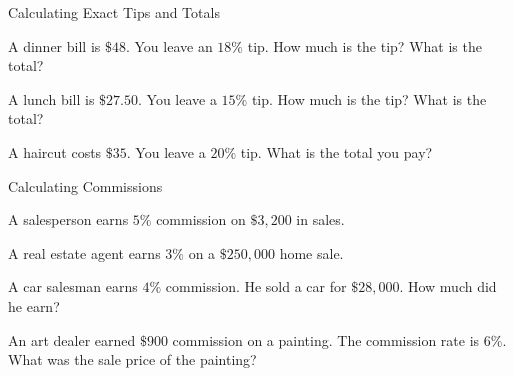 \begin{practiceBox}{Calculating Exact Tips and Totals}


\prob A dinner bill is $\$48$. You leave an $18\%$ tip. How much is the tip? What is the total?
\answerBlank[3cm]

\prob A lunch bill is $\$27.50$. You leave a $15\%$ tip. How much is the tip? What is the total?
\answerBlank[3cm]

\prob A haircut costs $\$35$. You leave a $20\%$ tip. What is the total you pay?
\answerBlank[3cm]

\end{practiceBox}

\begin{practiceBox}[funTeal]{Calculating Commissions}


\prob A salesperson earns $5\%$ commission on $\$3{,}200$ in sales. \answerBlank[3cm]

\prob A real estate agent earns $3\%$ on a $\$250{,}000$ home sale. \answerBlank[3cm]

\prob A car salesman earns $4\%$ commission. He sold a car for $\$28{,}000$. How much did he earn? \answerBlank[3cm]

\prob An art dealer earned $\$900$ commission on a painting. The commission rate is $6\%$. What was the sale price of the painting? \answerBlank[3cm]

\end{practiceBox}

